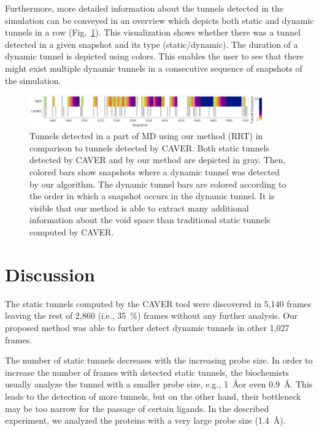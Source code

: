 \documentclass[usletter, 10pt, conference]{svjour3}      %
\begin{document}
Furthermore, more detailed information about the tunnels detected in the simulation can be conveyed in an overview which depicts both static and dynamic tunnels in a row (Fig.~\ref{fig::caver34}).
This visualization shows whether there was a tunnel detected in a given snapshot and its type (static/dynamic).
The duration of a dynamic tunnel is depicted using colors.
This enables the user to see that there might exist multiple dynamic tunnels in a consecutive sequence of snapshots of the simulation.


\begin{figure}
\centering
\includegraphics[width=0.9\textwidth]{fig/caver3450-3700_colored}
\caption{\label{fig::caver34}
Tunnels detected in a part of MD using our method (RRT) in comparison to tunnels detected by CAVER.
Both static tunnels detected by CAVER and by our method are depicted in gray.
Then, colored bars show snapshots where a dynamic tunnel was detected by our algorithm.
The dynamic tunnel bars are colored according to the order in which a snapshot occurs in the dynamic tunnel.
It is visible that our method is able to extract many additional information about the void space than traditional static tunnels computed by CAVER.
}
\end{figure}




\section{Discussion}

The static tunnels computed by the CAVER tool were discovered in 5,140 frames leaving the rest of 2,860 (i.e., 35~\%) 
frames without any further analysis.
Our proposed method was able to further detect dynamic tunnels in other 1,027 frames.


The number of static tunnels decreases with the increasing probe size. 
In order to increase the number of frames with detected static tunnels, the biochemists usually analyze the tunnel with a smaller probe size, e.g., 1~\AA or even 0.9~\AA.
This leads to the detection of more tunnels, but on the other hand, their bottleneck may be too narrow for the passage of certain ligands.
In the described experiment, we analyzed the proteins with a very large probe size (1.4~\AA).
\end{document}
